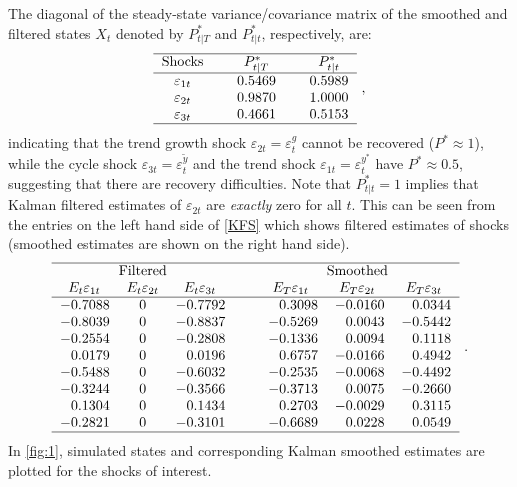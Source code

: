 \documentclass[a4paper,final,12pt]{article}
\makeatletter
\renewcommand\subsection{\@startsection{subsection}{1}{\z@}{-1.5ex \@plus -1ex \@minus -.2ex}{0.01ex \@plus.2ex}{\large\bfseries}}
\makeatother
\begin{document}
\subsection{Shock recovery}

The diagonal of the steady-state variance/covariance matrix of the smoothed
and filtered states $X_{t}$ denoted by $P_{t|T}^{\ast }$ and $P_{t|t}^{\ast
} $, respectively, are:%
\begin{equation}
\begin{tabular}{ccccc}
\hline
Shocks &  & $P_{t|T}^{\ast }$ &  & $P_{t|t}^{\ast }$ \\ \hline
$\varepsilon _{1t}$ &  & $0.5469$ &  & $0.5989$ \\ 
$\varepsilon _{2t}$ &  & $0.9870$ &  & $1.0000$ \\ 
$\varepsilon _{3t}$ &  & $0.4661$ &  & $0.5153$ \\ \hline
\end{tabular}%
~,  \label{Pstar}
\end{equation}%
indicating that the trend growth shock $\varepsilon _{2t}=\varepsilon
_{t}^{g}$ cannot be recovered ($P^{\ast }\approx 1$), while the cycle shock $%
\varepsilon _{3t}=\varepsilon _{t}^{\tilde{y}}$ and the trend shock $%
\varepsilon _{1t}=\varepsilon _{t}^{y^{\ast }}$ have $P^{\ast }\approx 0.5$,
suggesting that there are recovery difficulties. Note that $P_{t|t}^{\ast
}=1 $ implies that Kalman filtered estimates of $\varepsilon _{2t}$ are 
\emph{exactly} zero for all $t$. This can be seen from the entries on the
left hand side of \ref{KFS} which shows filtered estimates of shocks
(smoothed estimates are shown on the right hand side).%
\begin{equation}
\begin{tabular}{rcrcrrr}
\hline
\multicolumn{3}{c}{Filtered} & ~~ & \multicolumn{3}{c}{Smoothed$\ $} \\ 
$E_{t}\varepsilon _{1t}\ \ $ & $E_{t}\varepsilon _{2t}$ & $E_{t}\varepsilon
_{3t}\ \ $ & ~~ & $E_{T}\varepsilon _{1t}\ \ $ & $E_{T}\varepsilon _{2t}\ \ $
& $E_{T}\varepsilon _{3t}\ \ $ \\ \hline
$-0.7088$ & $0$ & $-0.7792$ &  & $0.3098$ & $-0.0160$ & $0.0344$ \\ 
$-0.8039$ & $0$ & $-0.8837$ &  & $-0.5269$ & $0.0043$ & $-0.5442$ \\ 
$-0.2554$ & $0$ & $-0.2808$ &  & $-0.1336$ & $0.0094$ & $0.1118$ \\ 
$0.0179$ & $0$ & $0.0196$ &  & $0.6757$ & $-0.0166$ & $0.4942$ \\ 
$-0.5488$ & $0$ & $-0.6032$ &  & $-0.2535$ & $-0.0068$ & $-0.4492$ \\ 
$-0.3244$ & $0$ & $-0.3566$ &  & $-0.3713$ & $0.0075$ & $-0.2660$ \\ 
$0.1304$ & $0$ & $0.1434$ &  & $0.2703$ & $-0.0029$ & $0.3115$ \\ 
$-0.2821$ & $0$ & $-0.3101$ &  & $-0.6689$ & $0.0228$ & $0.0549$ \\ \hline
\end{tabular}%
~.  \label{KFS}
\end{equation}%
In \autoref{fig:1}, simulated states and corresponding Kalman smoothed
estimates are plotted for the shocks of interest.
\end{document}
